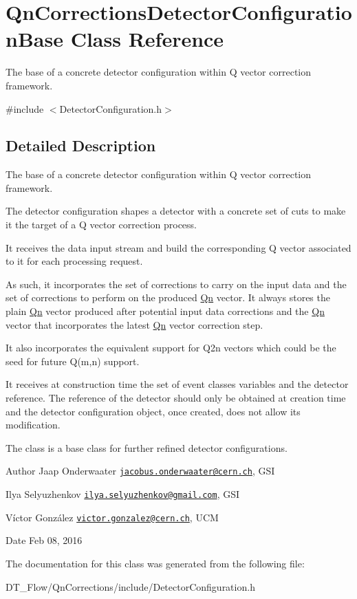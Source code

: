 \hypertarget{classQnCorrectionsDetectorConfigurationBase}{}\section{Qn\+Corrections\+Detector\+Configuration\+Base Class Reference}
\label{classQnCorrectionsDetectorConfigurationBase}


The base of a concrete detector configuration within Q vector correction framework.  




{\ttfamily \#include $<$Detector\+Configuration.\+h$>$}



\subsection{Detailed Description}
The base of a concrete detector configuration within Q vector correction framework. 

The detector configuration shapes a detector with a concrete set of cuts to make it the target of a Q vector correction process.

It receives the data input stream and build the corresponding Q vector associated to it for each processing request.

As such, it incorporates the set of corrections to carry on the input data and the set of corrections to perform on the produced \mbox{\hyperlink{namespaceQn}{Qn}} vector. It always stores the plain \mbox{\hyperlink{namespaceQn}{Qn}} vector produced after potential input data corrections and the \mbox{\hyperlink{namespaceQn}{Qn}} vector that incorporates the latest \mbox{\hyperlink{namespaceQn}{Qn}} vector correction step.

It also incorporates the equivalent support for Q2n vectors which could be the seed for future Q(m,n) support.

It receives at construction time the set of event classes variables and the detector reference. The reference of the detector should only be obtained at creation time and the detector configuration object, once created, does not allow its modification.

The class is a base class for further refined detector configurations.

\begin{DoxyAuthor}{Author}
Jaap Onderwaater \href{mailto:jacobus.onderwaater@cern.ch}{\tt jacobus.\+onderwaater@cern.\+ch}, G\+SI 

Ilya Selyuzhenkov \href{mailto:ilya.selyuzhenkov@gmail.com}{\tt ilya.\+selyuzhenkov@gmail.\+com}, G\+SI 

Víctor González \href{mailto:victor.gonzalez@cern.ch}{\tt victor.\+gonzalez@cern.\+ch}, U\+CM 
\end{DoxyAuthor}
\begin{DoxyDate}{Date}
Feb 08, 2016 
\end{DoxyDate}


The documentation for this class was generated from the following file\+:\begin{DoxyCompactItemize}
\item 
D\+T\+\_\+\+Flow/\+Qn\+Corrections/include/Detector\+Configuration.\+h\end{DoxyCompactItemize}
